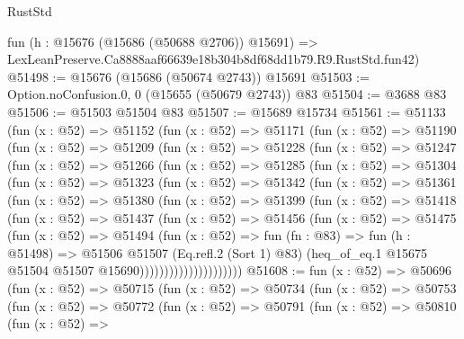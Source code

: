 \begin{lexlean}{RustStd}
\begin{coremodule}
    fun (h : @15676 (@15686 (@50688 @2706)) @15691) =>
    LexLeanPreserve.Ca8888aaf66639e18b304b8df68dd1b79.R9.RustStd.fun42)
@51498 := @15676 (@15686 (@50674 @2743)) @15691
@51503 := Option.noConfusion.{0, 0} (@15655 (@50679 @2743)) @83
@51504 := @3688 @83
@51506 := @51503 @51504 @83
@51507 := @15689 @15734
@51561 := @51133
    (fun (x : @52) =>
    @51152
      (fun (x : @52) =>
      @51171
        (fun (x : @52) =>
        @51190
          (fun (x : @52) =>
          @51209
            (fun (x : @52) =>
            @51228
              (fun (x : @52) =>
              @51247
                (fun (x : @52) =>
                @51266
                  (fun (x : @52) =>
                  @51285
                    (fun (x : @52) =>
                    @51304
                      (fun (x : @52) =>
                      @51323
                        (fun (x : @52) =>
                        @51342
                          (fun (x : @52) =>
                          @51361
                            (fun (x : @52) =>
                            @51380
                              (fun (x : @52) =>
                              @51399
                                (fun (x : @52) =>
                                @51418
                                  (fun (x : @52) =>
                                  @51437
                                    (fun (x : @52) =>
                                    @51456
                                      (fun (x : @52) =>
                                      @51475
                                        (fun (x : @52) =>
                                        @51494
                                          (fun (x : @52) =>
                                          fun (fn : @83) =>
                                          fun (h : @51498) =>
                                          @51506
                                            @51507
                                            (Eq.refl.{2} (Sort 1) @83)
                                            (heq_of_eq.{1}
                                              @15675
                                              @51504
                                              @51507
                                              @15690)))))))))))))))))))))
@51608 := fun (x : @52) =>
  @50696
    (fun (x : @52) =>
    @50715
      (fun (x : @52) =>
      @50734
        (fun (x : @52) =>
        @50753
          (fun (x : @52) =>
          @50772
            (fun (x : @52) =>
            @50791
              (fun (x : @52) =>
              @50810
                (fun (x : @52) =>

\end{coremodule}
\end{lexlean}

